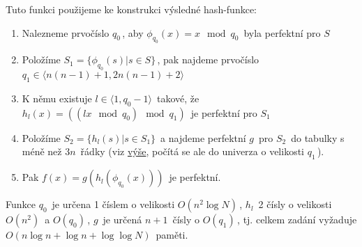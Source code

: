 Tuto funkci použijeme ke konstrukci výsledné hash-funkce:

\begin{enumerate}
\tightlist
\item
  Nalezneme prvočíslo \(q_0\,\!\), aby \(\phi_{q_0}(x)=x\mod q_0\,\!\)
  byla perfektní pro \(S\,\!\)
\item
  Položíme \(S_1=\{\phi_{q_0}(s)|s\in S\}\,\!\), pak najdeme prvočíslo
  \(q_1\in \langle n(n-1)+1,2n(n-1)+2\rangle\,\!\)
\item
  K němu existuje \(l\in \langle1,q_0-1\rangle\,\!\) takové, že
  \(h_l(x)=((lx\mod q_0)\mod q_1)\,\!\) je perfektní pro \(S_1\,\!\)
\item
  Položíme \(S_2=\{h_l(s)|s\in S_1\}\,\!\) a najdeme perfektní \(g\,\!\)
  pro \(S_2\,\!\) do tabulky s méně než \(3n\,\!\) řádky (viz
  \protect\hyperlink{Menux161uxed_tabulka}{výše}, počítá se ale do
  univerza o velikosti \(q_1\,\!\)).
\item
  Pak \(f(x)=g(h_l(\phi_{q_0}(x)))\,\!\) je perfektní.
\end{enumerate}

Funkce \(q_0\,\!\) je určena 1 číslem o velikosti \(O(n^2\log N)\,\!\),
\(h_l\,\!\) 2 čísly o velikosti \(O(n^2)\,\!\) a \(O(q_0)\,\!\),
\(g\,\!\) je určená \(n+1\,\!\) čísly o \(O(q_1)\,\!\), tj. celkem
zadání vyžaduje \(O(n\log n+\log n+\log\log N)\,\!\) paměti.
